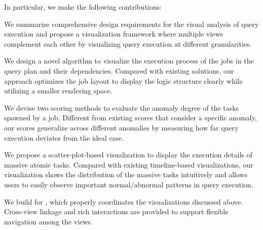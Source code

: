 In particular, we make the following contributions:
\squishlist 
\item {} 
We summarize comprehensive design requirements for the visual analysis of query execution and propose a visualization framework where multiple views complement each other by visualizing query execution at different granularities.  
\item {} We design a novel algorithm to visualize the execution process of the jobs in the query plan and their dependencies.
Compared with existing solutions, our approach optimizes the job layout to display the logic structure clearly while utilizing a smaller rendering space.
\item {} We devise two scoring methods to evaluate the anomaly degree of the tasks spawned by a job. Different from existing scores that consider a specific anomaly, our scores generalize across different anomalies by measuring how far query execution deviates from the ideal case. 
\item {} We propose a scatter-plot-based visualization to display the execution details of massive atomic tasks. Compared with existing timeline-based visualizations, our visualization shows the distribution of the massive tasks intuitively and allows users to easily observe important normal/abnormal patterns in query execution.
\item {} We build \qevis{} for \hive{}, which properly coordinates the visualizations discussed above. 
Cross-view linkage and rich interactions are provided to support flexible navigation among the views.
\squishend

